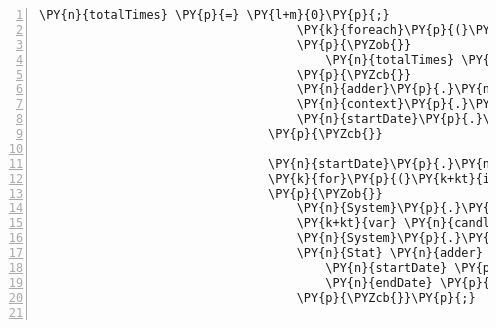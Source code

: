 \begin{Verbatim}[commandchars=\\\{\},numbers=left,firstnumber=1,stepnumber=1,numberblanklines=0]
                                    \PY{n}{totalTimes} \PY{p}{=} \PY{l+m}{0}\PY{p}{;}
                                    \PY{k}{foreach}\PY{p}{(}\PY{n}{TimeSpan} \PY{n}{time} \PY{k}{in} \PY{n}{declineTimes}\PY{p}{)}
                                    \PY{p}{\PYZob{}}
                                        \PY{n}{totalTimes} \PY{p}{+}\PY{p}{=} \PY{n}{t}\PY{p}{.}\PY{n}{TotalMilliseconds}\PY{p}{;}
                                    \PY{p}{\PYZcb{}}
                                    \PY{n}{adder}\PY{p}{.}\PY{n}{avgDeclineTime} \PY{p}{=} \PY{n}{TimeSpan}\PY{p}{.}\PY{n}{FromMilliseconds}\PY{p}{(}\PY{n}{totalTimes} \PY{p}{/} \PY{n}{declineTimes}\PY{p}{.}\PY{n}{Count}\PY{p}{(}\PY{p}{)}\PY{p}{)}\PY{p}{;}
                                    \PY{n}{context}\PY{p}{.}\PY{n}{Stats}\PY{p}{.}\PY{n}{Add}\PY{p}{(}\PY{n}{adder}\PY{p}{)}\PY{p}{;}
                                    \PY{n}{startDate}\PY{p}{.}\PY{n}{AddDays}\PY{p}{(}\PY{l+m}{1}\PY{p}{)}\PY{p}{;}
                                \PY{p}{\PYZcb{}}

                                \PY{n}{startDate}\PY{p}{.}\PY{n}{AddDays}\PY{p}{(}\PY{p}{\PYZhy{}}\PY{n}{days}\PY{p}{)}\PY{p}{;}
                                \PY{k}{for}\PY{p}{(}\PY{k+kt}{int} \PY{n}{i} \PY{p}{=} \PY{l+m}{0}\PY{p}{;} \PY{n}{i} \PY{p}{\PYZlt{}} \PY{n}{days}\PY{p}{;} \PY{n}{i}\PY{p}{+}\PY{p}{+}\PY{p}{)}
                                \PY{p}{\PYZob{}}
                                    \PY{n}{System}\PY{p}{.}\PY{n}{Threading}\PY{p}{.}\PY{n}{Thread}\PY{p}{.}\PY{n}{Sleep}\PY{p}{(}\PY{l+m}{1}\PY{l+m}{0}\PY{l+m}{0}\PY{l+m}{0}\PY{p}{)}\PY{p}{;}
                                    \PY{k+kt}{var} \PY{n}{candles} \PY{p}{=} \PY{n}{client}\PY{p}{.}\PY{n}{ProductsService}\PY{p}{.}\PY{n}{GetHistoricRatesAsync}\PY{p}{(}\PY{n}{p}\PY{p}{.}\PY{n}{Id}\PY{p}{,} \PY{n}{startDate}\PY{p}{,} \PY{n}{endDate}\PY{p}{,} \PY{n}{CandleGranularity}\PY{p}{.}\PY{n}{Minutes1}\PY{p}{)}\PY{p}{.}\PY{n}{Result}\PY{p}{;}
                                    \PY{n}{System}\PY{p}{.}\PY{n}{Threading}\PY{p}{.}\PY{n}{Thread}\PY{p}{.}\PY{n}{Sleep}\PY{p}{(}\PY{l+m}{1}\PY{l+m}{0}\PY{l+m}{0}\PY{l+m}{0}\PY{p}{)}\PY{p}{;}
                                    \PY{n}{Stat} \PY{n}{adder} \PY{p}{=} \PY{k}{new} \PY{n}{Stat}\PY{p}{(}\PY{p}{)}\PY{p}{\PYZob{}}
                                        \PY{n}{startDate} \PY{p}{=} \PY{n}{candles}\PY{p}{.}\PY{n}{First}\PY{p}{(}\PY{p}{)}\PY{p}{.}\PY{n}{Time}\PY{p}{,}
                                        \PY{n}{endDate} \PY{p}{=} \PY{n}{candles}\PY{p}{.}\PY{n}{Last}\PY{p}{(}\PY{p}{)}\PY{p}{.}\PY{n}{Time}  
                                    \PY{p}{\PYZcb{}}\PY{p}{;}


\end{Verbatim}

